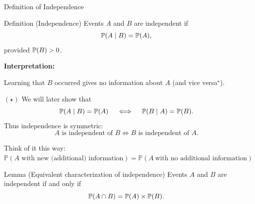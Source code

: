 \begin{frame}{Definition of Independence}

\begin{keybox}{Definition (Independence)}
Events $A$ and $B$ are independent if
\[
\mathbb{P}(A\mid B)=\mathbb{P}(A),
\]
provided $\mathbb{P}(B)>0$.
\end{keybox}


\textbf{Interpretation:}

Learning that $B$ occurred gives no information about $A$
(and vice versa$^\star$).


{\footnotesize
$(\star)$ We will later show that
\[
\mathbb{P}(A\mid B)=\mathbb{P}(A)
\quad\iff \quad
\mathbb{P}(B\mid A)=\mathbb{P}(B).
\]
Thus independence is symmetric:
\[
A \text{ is independent of } B
\iff
B \text{ is independent of } A.
\]
}

Think of it this way: $\mathbb{P}(A \text{ with new (additional) information}) = \mathbb{P}(A \ \text{with no additional information})$

\begin{keybox}{Lemma (Equivalent characterization of independence)}
Events $A$ and $B$ are independent if and only if
\[
\mathbb{P}(A\cap B)
=
\mathbb{P}(A)\times \mathbb{P}(B).
\]
\end{keybox}

\end{frame}

